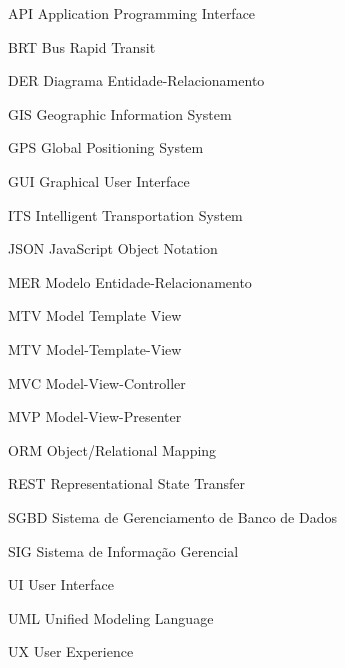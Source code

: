 \begin{siglas}
    \item[API] Application Programming Interface
    \item[BRT] Bus Rapid Transit
    \item[DER] Diagrama Entidade-Relacionamento
    \item[GIS] Geographic Information System
    \item[GPS] Global Positioning System
    \item[GUI] Graphical User Interface
    \item[ITS] Intelligent Transportation System
    \item[JSON] JavaScript Object Notation
    \item[MER] Modelo Entidade-Relacionamento
    \item[MTV] Model Template View
    \item[MTV] Model-Template-View
    \item[MVC] Model-View-Controller
    \item[MVP] Model-View-Presenter
    \item[ORM] Object/Relational Mapping
    \item[REST] Representational State Transfer
    \item[SGBD] Sistema de Gerenciamento de Banco de Dados
    \item[SIG] Sistema de Informação Gerencial
    \item[UI] User Interface
    \item[UML] Unified Modeling Language
    \item[UX] User Experience
\end{siglas}